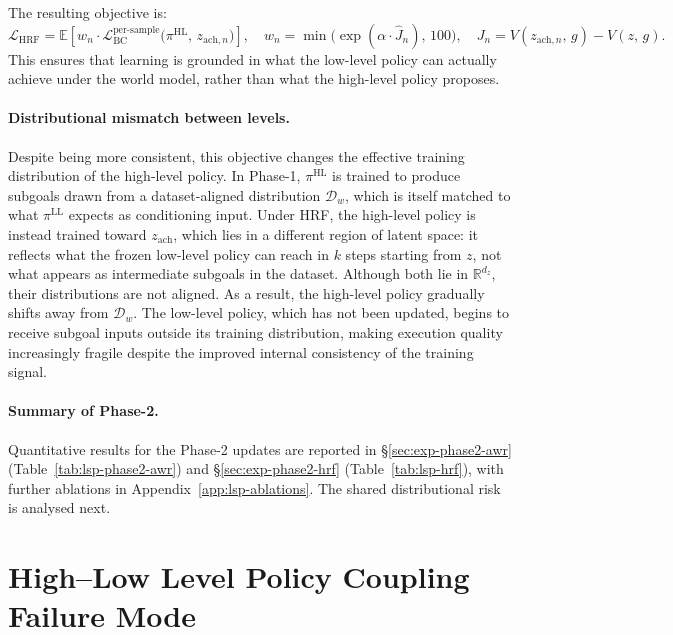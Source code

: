 The resulting objective is:
\begin{equation}
\mathcal{L}_{\mathrm{HRF}} = \mathbb{E}\!\left[
w_n\cdot\mathcal{L}_{\mathrm{BC}}^{\mathrm{per\text{-}sample}}
\!\bigl(\pi^{\mathrm{HL}},\,z_{\mathrm{ach},n}\bigr)\right],
\quad
w_n = \min\!\bigl(\exp(\alpha\cdot\hat J_n),\,100\bigr),
\quad
J_n = V(z_{\mathrm{ach},n},\,g) - V(z,\,g).
\end{equation}
This ensures that learning is grounded in what the low-level policy can actually achieve under the world model, rather than what the high-level policy proposes.

\paragraph{Distributional mismatch between levels.}
Despite being more consistent, this objective changes the effective training distribution of the high-level policy. In Phase-1, $\pi^{\mathrm{HL}}$ is trained to produce subgoals drawn from a dataset-aligned distribution $\mathcal{D}_w$, which is itself matched to what $\pi^{\mathrm{LL}}$ expects as conditioning input.
Under HRF, the high-level policy is instead trained toward $z_{\mathrm{ach}}$, which lies in a different region of latent space: it reflects what the frozen low-level policy can reach in $k$ steps starting from $z$, not what appears as intermediate subgoals in the dataset. Although both lie in $\mathbb{R}^{d_z}$, their distributions are not aligned.
As a result, the high-level policy gradually shifts away from $\mathcal{D}_w$. The low-level policy, which has not been updated, begins to receive subgoal inputs outside its training distribution, making execution quality increasingly fragile despite the improved internal consistency of the training signal.

\paragraph{Summary of Phase-2.}
Quantitative results for the Phase-2 updates are reported in
\S\ref{sec:exp-phase2-awr} (Table~\ref{tab:lsp-phase2-awr}) and
\S\ref{sec:exp-phase2-hrf} (Table~\ref{tab:lsp-hrf}), with further
ablations in Appendix~\ref{app:lsp-ablations}. The shared distributional
risk is analysed next.

\section{High--Low Level Policy Coupling Failure Mode}
\label{sec:lsp-barrier}


